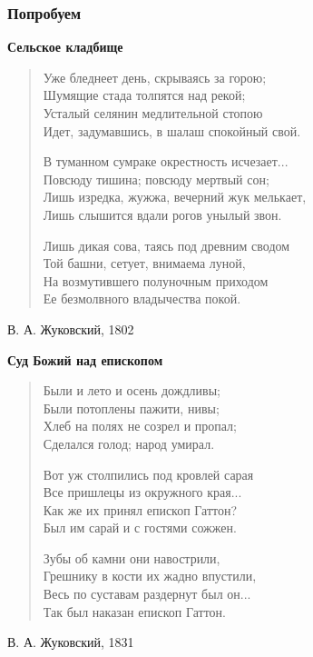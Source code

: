 \documentclass{beamer}
\begin{document}
\begin{frame}
\frametitle{Попробуем}

\begin{center}
\textbf{Сельское кладбище}
\end{center}

\begin{verse}
Уже бледнеет день, скрываясь за горою;\\
Шумящие стада толпятся над рекой;\\
Усталый селянин медлительной стопою\\
Идет, задумавшись, в шалаш спокойный свой.

В туманном сумраке окрестность исчезает...\\
Повсюду тишина; повсюду мертвый сон;\\
Лишь изредка, жужжа, вечерний жук мелькает,\\
Лишь слышится вдали рогов унылый звон.

Лишь дикая сова, таясь под древним сводом\\
Той башни, сетует, внимаема луной,\\
На возмутившего полуночным приходом\\
Ее безмолвного владычества покой.
\end{verse}

В. А. Жуковский, 1802

\end{frame}


\begin{frame}

\begin{center}
\textbf{Суд Божий над епископом}
\end{center}

\begin{verse}
Были и лето и осень дождливы;\\
Были потоплены пажити, нивы;\\
Хлеб на полях не созрел и пропал;\\
Сделался голод; народ умирал.

Вот уж столпились под кровлей сарая\\
Все пришлецы из окружного края...\\
Как же их принял епископ Гаттон?\\
Был им сарай и с гостями сожжен.

Зубы об камни они навострили,\\
Грешнику в кости их жадно впустили,\\
Весь по суставам раздернут был он...\\
Так был наказан епископ Гаттон.
\end{verse}

В. А. Жуковский, 1831

\end{frame}
\end{document}
